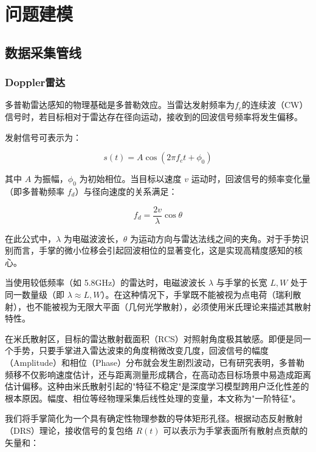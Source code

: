 \section{问题建模}

\subsection{数据采集管线}

\subsubsection{Doppler雷达}

多普勒雷达感知的物理基础是多普勒效应。当雷达发射频率为$f_{c}$的连续波（CW）信号时，若目标相对于雷达存在径向运动，接收到的回波信号频率将发生偏移。

发射信号可表示为：

\begin{equation}
    s(t) = A\cos(2\pi f_{c}t + \phi_{0})
\end{equation}

其中 $A$ 为振幅，$\phi_{0}$ 为初始相位。当目标以速度 $v$ 运动时，回波信号的频率变化量（即多普勒频率 $f_{d}$）与径向速度的关系满足：

\begin{equation}
    f_{d} = \frac{2v}{\lambda}\cos\theta
\end{equation}

在此公式中，$\lambda$ 为电磁波波长，$\theta$ 为运动方向与雷达法线之间的夹角。对于手势识别而言，手掌的微小位移会引起回波相位的显著变化，这是实现高精度感知的核心。

当使用较低频率（如 5.8GHz）的雷达时，电磁波波长 $\lambda$ 与手掌的长宽 $L, W$ 处于同一数量级（即 $\lambda \approx L, W$）。在这种情况下，手掌既不能被视为点电荷（瑞利散射），也不能被视为无限大平面（几何光学散射），必须使用米氏理论来描述其散射特性。

在米氏散射区，目标的雷达散射截面积（RCS）对照射角度极其敏感。即便是同一个手势，只要手掌进入雷达波束的角度稍微改变几度，回波信号的幅度（Amplitude）和相位（Phase）分布就会发生剧烈波动，已有研究表明，多普勒频移不仅影响速度估计，还与距离测量形成耦合，在高动态目标场景中易造成距离估计偏移\cite{yu2026dopplerrange}。这种由米氏散射引起的"特征不稳定"是深度学习模型跨用户泛化性差的根本原因。幅度、相位等经物理采集后线性处理的变量，本文称为"一阶特征"。

我们将手掌简化为一个具有确定性物理参数的导体矩形孔径。根据动态反射散射（DRS）理论，接收信号的复包络 $R(t)$ 可以表示为手掌表面所有散射点贡献的矢量和：

